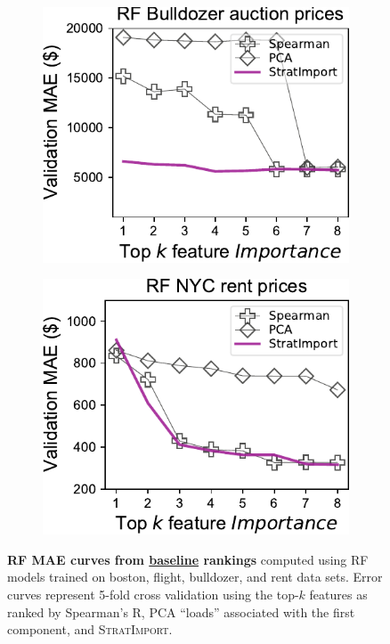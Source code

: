 \documentclass[11pt]{article}
\newcommand{\simpo}{\fontfamily{cmr}\textsc{\small StratImport}}
\begin{document}
\begin{figure}
\begin{subfigure}{.245\textwidth}
\includegraphics[scale=0.45]{images/bulldozer-topk-RF-baseline.pdf}
\subcaption{}
\end{subfigure}
\begin{subfigure}{.245\textwidth}
    \centering
\includegraphics[scale=0.45]{images/rent-topk-RF-baseline.pdf}
\subcaption{}
\end{subfigure} 
\caption{\small {\bf RF MAE curves from \underline{baseline} rankings} computed using RF models trained on boston, flight, bulldozer, and rent data sets. Error curves represent 5-fold cross validation using the top-$k$ features as ranked by Spearman's R, PCA ``loads'' associated with the first component, and \simpo{}.}
\label{fig:baseline}
\end{figure}
\end{document}

